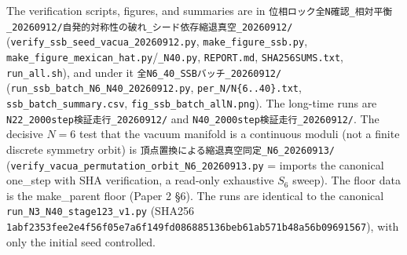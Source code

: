 \documentclass[
  a4paper,
]{ltjsarticle}
\begin{document}
The verification scripts, figures, and summaries are in
\texttt{位相ロック全N確認\_相対平衡\_20260912/自発的対称性の破れ\_シード依存縮退真空\_20260912/}
(\texttt{verify\_ssb\_seed\_vacua\_20260912.py},
\texttt{make\_figure\_ssb.py},
\texttt{make\_figure\_mexican\_hat.py}/\texttt{\_N40.py},
\texttt{REPORT.md}, \texttt{SHA256SUMS.txt}, \texttt{run\_all.sh}), and
under it \texttt{全N6\_40\_SSBバッチ\_20260912/}
(\texttt{run\_ssb\_batch\_N6\_N40\_20260912.py},
\texttt{per\_N/N\{6..40\}.txt}, \texttt{ssb\_batch\_summary.csv},
\texttt{fig\_ssb\_batch\_allN.png}). The long-time runs are
\texttt{N22\_2000step検証走行\_20260912/} and
\texttt{N40\_2000step検証走行\_20260912/}. The decisive \(N=6\) test
that the vacuum manifold is a continuous moduli (not a finite discrete
symmetry orbit) is \texttt{頂点置換による縮退真空同定\_N6\_20260913/}
(\texttt{verify\_vacua\_permutation\_orbit\_N6\_20260913.py} = imports
the canonical one\_step with SHA verification, a read-only exhaustive
\(S_6\) sweep). The floor data is the make\_parent floor (Paper 2 §6).
The runs are identical to the canonical
\texttt{run\_N3\_N40\_stage123\_v1.py} (SHA256
\texttt{1abf2353fee2e4f56f05e7a6f149fd086885136beb61ab571b48a56b09691567}),
with only the initial seed controlled.
\end{document}
